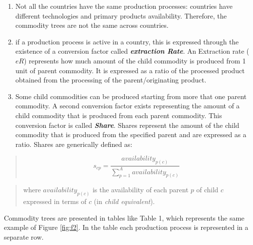 \documentclass[]{article}
\begin{document}
\begin{enumerate}
\def\labelenumi{\arabic{enumi}.}
\setcounter{enumi}{1}
\item
  Not all the countries have the same production processes: countries
  have different technologies and primary products availability.
  Therefore, the commodity trees are not the same across countries.
\item
  if a production process is active in a country, this is expressed
  through the existence of a conversion factor called
  \textbf{\emph{extraction Rate}}. An Extraction rate (\(eR\))
  represents how much amount of the child commodity is produced from 1
  unit of parent commodity. It is expressed as a ratio of the processed
  product obtained from the processing of the parent/originating
  product.
\item
  Some child commodities can be produced starting from more that one
  parent commodity. A second conversion factor exists representing the
  amount of a child commodity that is produced from each parent
  commodity. This conversion factor is called \textbf{\emph{Share}}.
  Shares represent the amount of the child commodity that is produced
  from the specified parent and are expressed as a ratio. Shares are
  generically defined as:
\end{enumerate}

\begin{quote}
\begin{equation}
\label{eq:sharesGen}
s_{cp} = \frac{availability_{p(c)}}{\sum \limits_{p=1}^A{availability_{p(c)}}}
\end{equation}
\end{quote}

\begin{quote}
where \(availability_{p(c)}\) is the availability of each parent \(p\)
of child \(c\) expressed in terms of \(c\) (in \emph{child equivalent}).
\end{quote}

Commodity trees are presented in tables like Table 1, which represents
the same example of Figure \ref{fig:f2}. In the table each production
process is represented in a separate row.
\end{document}
